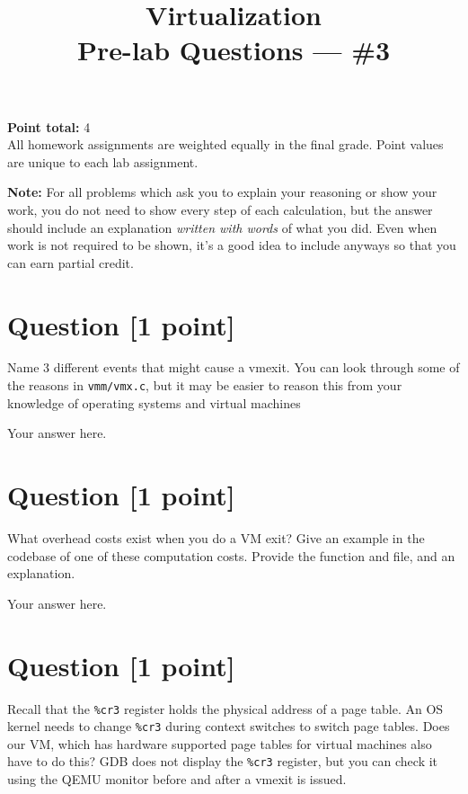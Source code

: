 \documentclass[11pt]{article}
\providecommand{\due}{}
\begin{document}
\title{Virtualization\\Pre-lab Questions --- \#3}
\date{\due}

\maketitle

\noindent \textbf{Point total:} 4
\\ All homework assignments are weighted equally in the final grade. Point values are unique to each lab assignment.

\textbf{Note:} For all problems which ask you to explain your reasoning or show your work, you do not need to show every step of each calculation, but the answer should include an explanation \emph{written with words} of what you did.  Even when work is not required to be shown, it’s a good idea to include anyways so that you can earn partial credit.

\section{Question [1 point]}

Name 3 different events that might cause a vmexit. You can look through some of the reasons in \texttt{vmm/vmx.c}, but it may be easier to reason this from your knowledge of operating systems and virtual machines

\begin{solution}
Your answer here.
\end{solution}


\section{Question [1 point]}

What overhead costs exist when you do a VM exit? Give an example in the codebase of one of these computation costs. Provide the function and file, and an explanation.

\begin{solution}
Your answer here.
\end{solution}


\section{Question [1 point]}

Recall that the \texttt{\%cr3} register holds the physical address of a page table. An OS kernel needs to change \texttt{\%cr3} during context switches to switch page tables. Does our VM, which has hardware supported page tables for virtual machines also have to do this? GDB does not display the \texttt{\%cr3} register, but you can check it using the QEMU monitor before and after a vmexit is issued.
\end{document}

